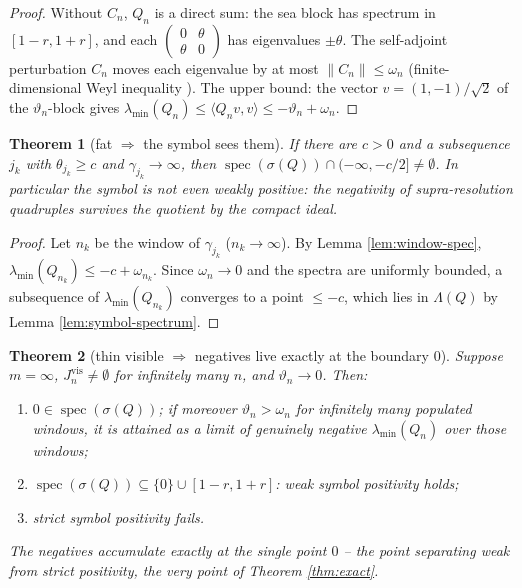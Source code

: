 \documentclass[11pt,reqno]{amsart}
\newtheorem{theorem}{Theorem}[section]
\theoremstyle{definition}
\newcommand{\spec}{\operatorname{spec}}
\begin{document}
\begin{proof}
Without \(C_n\), \(Q_n\) is a direct sum: the sea block has spectrum in
\([1-r,1+r]\), and each
\(\left(\begin{smallmatrix}0&\theta\\\theta&0\end{smallmatrix}\right)\) has
eigenvalues \(\pm\theta\). The self-adjoint perturbation \(C_n\) moves each
eigenvalue by at most \(\|C_n\|\leq\omega_n\) (finite-dimensional Weyl
inequality \cite{Bhatia}). The upper bound: the vector \(v=(1,-1)/\sqrt2\) of
the \(\vartheta_n\)-block gives
\(\lambda_{\min}(Q_n)\leq\langle Q_nv,v\rangle\leq-\vartheta_n+\omega_n\).
\end{proof}

\begin{theorem}[fat \(\Rightarrow\) the symbol sees them]\label{thm:fat}
If there are \(c>0\) and a subsequence \(j_k\) with \(\theta_{j_k}\geq c\) and
\(\gamma_{j_k}\to\infty\), then
\(\spec(\sigma(Q))\cap(-\infty,-c/2]\neq\emptyset\). In particular the symbol is
not even weakly positive: the negativity of supra-resolution quadruples
\emph{survives the quotient by the compact ideal}.
\end{theorem}

\begin{proof}
Let \(n_k\) be the window of \(\gamma_{j_k}\) (\(n_k\to\infty\)). By Lemma
\ref{lem:window-spec}, \(\lambda_{\min}(Q_{n_k})\leq-c+\omega_{n_k}\). Since
\(\omega_n\to0\) and the spectra are uniformly bounded, a subsequence of
\(\lambda_{\min}(Q_{n_k})\) converges to a point \(\leq-c\), which lies in
\(\Lambda(Q)\) by Lemma \ref{lem:symbol-spectrum}.
\end{proof}

\begin{theorem}[thin visible \(\Rightarrow\) negatives live exactly at the
boundary \(0\)]\label{thm:thin}
Suppose \(m=\infty\), \(J_n^{\mathrm{vis}}\neq\emptyset\) for infinitely many
\(n\), and \(\vartheta_n\to0\). Then:
\begin{enumerate}
\item[\textup{(i)}] \(0\in\spec(\sigma(Q))\); if moreover \(\vartheta_n>\omega_n\)
for infinitely many populated windows, it is attained as a limit of genuinely
\emph{negative} \(\lambda_{\min}(Q_n)\) over those windows;
\item[\textup{(ii)}] \(\spec(\sigma(Q))\subseteq\{0\}\cup[1-r,1+r]\): weak symbol
positivity \emph{holds};
\item[\textup{(iii)}] strict symbol positivity \emph{fails}.
\end{enumerate}
The negatives accumulate exactly at the single point \(0\) -- the point
separating weak from strict positivity, the very point of Theorem
\ref{thm:exact}.
\end{theorem}
\end{document}
